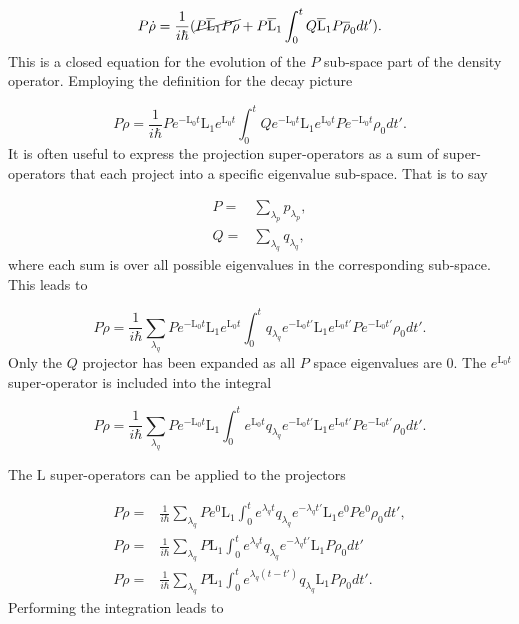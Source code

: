 \documentclass[12pt]{article}
\begin{document}
\begin{equation}
   P\dot{\rho} = \frac{1}{i\hbar}(\cancel{P\overline{\mathrm{L}}_1P\rho}+P\overline{\mathrm{L}}_1\int_0^t Q\overline{\mathrm{L}}_1 P\overline{\rho}_0 dt').  
\end{equation} This is a closed equation for the evolution of the $P$ sub-space part of the density operator. Employing the definition for the decay picture

\begin{equation}
   P\dot{\rho} = \frac{1}{i\hbar}Pe^{-\mathrm{L}_0 t}\mathrm{L}_1e^{\mathrm{L}_0 t}\int_0^t Qe^{-\mathrm{L}_0 t}\mathrm{L}_1e^{\mathrm{L}_0 t} Pe^{-\mathrm{L}_0 t}\rho_0 dt'.  
\end{equation} It is often useful to express the projection super-operators as a sum of super-operators that each project into a specific eigenvalue sub-space. That is to say

\begin{align}
    P =& \sum_{\lambda_p} p_{\lambda_p},\\
    Q =& \sum_{\lambda_q} q_{\lambda_q},
\end{align} where each sum is over all possible eigenvalues in the corresponding sub-space. This leads to 

\begin{equation}
   P\dot{\rho} = \frac{1}{i\hbar}\sum_{\lambda_q} P e^{-\mathrm{L}_0 t}\mathrm{L}_1e^{\mathrm{L}_0 t}\int_0^t  q_{\lambda_q}e^{-\mathrm{L}_0 t'}\mathrm{L}_1e^{\mathrm{L}_0 t'}P e^{-\mathrm{L}_0 t'}\rho_0 dt'.  
\end{equation} Only the $Q$ projector has been expanded as all $P$ space eigenvalues are 0. The $e^{\mathrm{L}_0 t}$ super-operator is included into the integral 

\begin{equation}
   P\dot{\rho} = \frac{1}{i\hbar}\sum_{\lambda_q} P e^{-\mathrm{L}_0 t}\mathrm{L}_1\int_0^t  e^{\mathrm{L}_0 t}q_{\lambda_q}e^{-\mathrm{L}_0 t'}\mathrm{L}_1e^{\mathrm{L}_0 t'}P e^{-\mathrm{L}_0 t'}\rho_0 dt'.  
\end{equation} 

The $\mathrm{L}$ super-operators can be applied to the projectors 

\begin{align}
   P\dot{\rho} =& \frac{1}{i\hbar}\sum_{\lambda_q} P e^{0}\mathrm{L}_1\int_0^t  e^{\lambda_q t}q_{\lambda_q}e^{-\lambda_q t'}\mathrm{L}_1e^{0}P e^{0}\rho_0 dt', \nonumber \\ 
    P\dot{\rho} =& \frac{1}{i\hbar}\sum_{\lambda_q} P \mathrm{L}_1\int_0^t  e^{\lambda_q t}q_{\lambda_q}e^{-\lambda_q t'}\mathrm{L}_1P\rho_0 dt' \nonumber \\
    P\dot{\rho} =& \frac{1}{i\hbar}\sum_{\lambda_q} P \mathrm{L}_1\int_0^t  e^{\lambda_q (t- t')}q_{\lambda_q}\mathrm{L}_1P\rho_0 dt'.
\end{align} Performing the integration leads to
\end{document}
